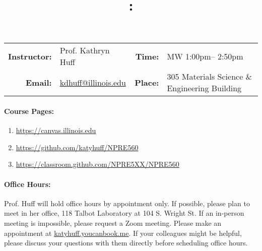 \documentclass[11pt]{article}
\title{\CourseNumber: \CourseTitle\\}
\author{\CourseUniversity}
\date{\CourseSemester \CourseYear}
\makeatletter
\newcommand{\CourseNumber}{NPRE560}
\newcommand{\CourseDays}{MW\xspace}%
\newcommand{\CourseStart}{1:00pm\xspace}%
\newcommand{\CourseEnd}{2:50pm\xspace}%
\newcommand{\CourseInstructor}{Prof. Kathryn Huff}
\newcommand{\CourseInstructorEmail}{kdhuff@illinois.edu}
\newcommand{\CourseRoom}{305\xspace}%
\newcommand{\CourseBuilding}{Materials Science \& Engineering Building\xspace}%
\newcommand{\TeachingAssistant}{TA Name\xspace}%
\newcommand{\TAOfficeHourDays}{Wednesdays\xspace}%
\newcommand{\TAOfficeHourStart}{1:00pm\xspace}%
\newcommand{\TAOfficeHourEnd}{3:00pm\xspace}%
\newcommand{\TAOfficeHourPlace}{123 Talbot Laboratory\xspace}
\makeatother
\begin{document}
\maketitle
\renewcommand{\arraystretch}{2}
\begin{center}
\begin{table}[h]
\begin{tabularx}{\textwidth}{rXrX}
\hline
\textbf{Instructor:} & \CourseInstructor & \textbf{Time:} & \CourseDays \CourseStart -- \CourseEnd \\
\textbf{Email:} &  \href{mailto:\CourseInstructorEmail}{\CourseInstructorEmail} & \textbf{Place:} & \CourseRoom \CourseBuilding\\
\hline
\end{tabularx}

\end{table}
\end{center}

\paragraph{Course Pages:}
\begin{enumerate}
        \item \url{https://canvas.illinois.edu}
        \item \url{https://github.com/katyhuff/\CourseNumber}
        \item \url{https://classroom.github.com/NPRE5XX/\CourseNumber}
\end{enumerate}


\paragraph{Office Hours:} Prof. Huff will hold office hours by appointment 
only.  If possible, please plan to meet in her office, 118 Talbot Laboratory at 
104 S. Wright St. If an in-person meeting is impossible, please request a Zoom 
meeting.  Please make an appointment at \url{katyhuff.youcanbook.me}.  If your 
colleagues might be helpful, please discuss your questions with them directly 
before scheduling office hours.
\end{document}
